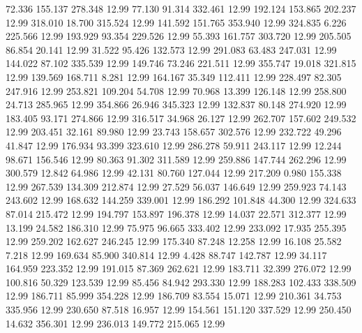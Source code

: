   72.336  155.137  278.348        12.99
  77.130   91.314  332.461        12.99
 192.124  153.865  202.237        12.99
 318.010   18.700  315.524        12.99
 141.592  151.765  353.940        12.99
 324.835    6.226  225.566        12.99
 193.929   93.354  229.526        12.99
  55.393  161.757  303.720        12.99
 205.505   86.854   20.141        12.99
  31.522   95.426  132.573        12.99
 291.083   63.483  247.031        12.99
 144.022   87.102  335.539        12.99
 149.746   73.246  221.511        12.99
 355.747   19.018  321.815        12.99
 139.569  168.711    8.281        12.99
 164.167   35.349  112.411        12.99
 228.497   82.305  247.916        12.99
 253.821  109.204   54.708        12.99
  70.968   13.399  126.148        12.99
 258.800   24.713  285.965        12.99
 354.866   26.946  345.323        12.99
 132.837   80.148  274.920        12.99
 183.405   93.171  274.866        12.99
 316.517   34.968   26.127        12.99
 262.707  157.602  249.532        12.99
 203.451   32.161   89.980        12.99
  23.743  158.657  302.576        12.99
 232.722   49.296   41.847        12.99
 176.934   93.399  323.610        12.99
 286.278   59.911  243.117        12.99
  12.244   98.671  156.546        12.99
  80.363   91.302  311.589        12.99
 259.886  147.744  262.296        12.99
 300.579   12.842   64.986        12.99
  42.131   80.760  127.044        12.99
 217.209    0.980  155.338        12.99
 267.539  134.309  212.874        12.99
  27.529   56.037  146.649        12.99
 259.923   74.143  243.602        12.99
 168.632  144.259  339.001        12.99
 186.292  101.848   44.300        12.99
 324.633   87.014  215.472        12.99
 194.797  153.897  196.378        12.99
  14.037   22.571  312.377        12.99
  13.199   24.582  186.310        12.99
  75.975   96.665  333.402        12.99
 233.092   17.935  255.395        12.99
 259.202  162.627  246.245        12.99
 175.340   87.248   12.258        12.99
  16.108   25.582    7.218        12.99
 169.634   85.900  340.814        12.99
   4.428   88.747  142.787        12.99
  34.117  164.959  223.352        12.99
 191.015   87.369  262.621        12.99
 183.711   32.399  276.072        12.99
 100.816   50.329  123.539        12.99
  85.456   84.942  293.330        12.99
 188.283  102.433  338.509        12.99
 186.711   85.999  354.228        12.99
 186.709   83.554   15.071        12.99
 210.361   34.753  335.956        12.99
 230.650   87.518   16.957        12.99
 154.561  151.120  337.529        12.99
 250.450   14.632  356.301        12.99
 236.013  149.772  215.065        12.99
